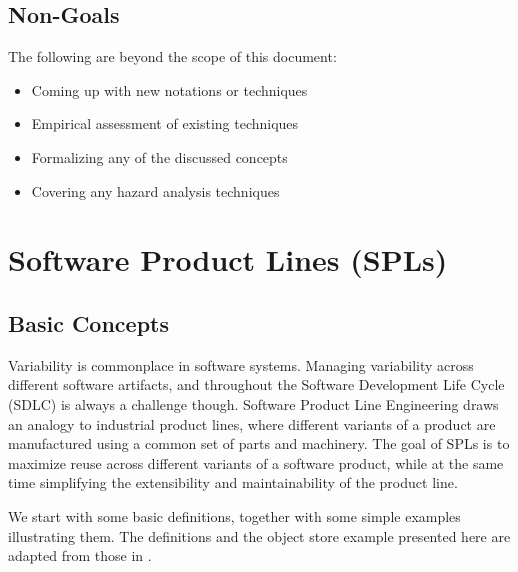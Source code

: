 \documentclass[11pt]{article}
\begin{document}
\subsection{Non-Goals} 

The following are beyond the scope of this document:

\begin{itemize}
\item Coming up with new notations or techniques
\item Empirical assessment of existing techniques
\item Formalizing any of the discussed concepts
\item Covering any hazard analysis techniques
\end{itemize}

%
%
%
\section{Software Product Lines (SPLs)}

\subsection{Basic Concepts}

Variability is commonplace in software systems. Managing variability across different software artifacts, and throughout the Software Development Life Cycle (SDLC) is always a challenge though. Software Product Line Engineering draws an analogy to industrial product lines, where different variants of a product are manufactured using a common set of parts and machinery. The goal of SPLs is to maximize reuse across different variants of a software product, while at the same time simplifying the extensibility and maintainability of the product line.

We start with some basic definitions, together with some simple examples illustrating them. The definitions and the object store example presented here are adapted from those in \cite{Thum}.
\end{document}
